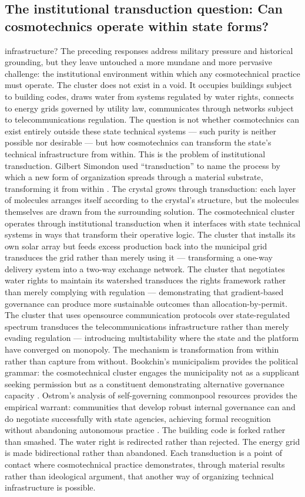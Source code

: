 \subsection{The institutional transduction question: Can cosmotechnics operate within state forms?}

infrastructure? The preceding responses address military pressure and historical grounding, but they leave untouched a more mundane and more pervasive challenge: the institutional environment within which any cosmotechnical practice must operate. The cluster does not exist in a void. It occupies buildings subject to building codes, draws water from systems regulated by water rights, connects to energy grids governed by utility law, communicates through networks subject to telecommunications regulation. The question is not whether cosmotechnics can exist entirely outside these state technical systems — such purity is neither possible nor desirable — but how cosmotechnics can transform the state’s technical infrastructure from within. This is the problem of institutional transduction. Gilbert Simondon used “transduction” to name the process by which a new form of organization spreads through a material substrate, transforming it from within \cite[pp.~11--32]{simondon_2017}. The crystal grows through transduction: each layer of molecules arranges itself according to the crystal’s structure, but the molecules themselves are drawn from the surrounding solution. The cosmotechnical cluster operates through institutional transduction when it interfaces with state technical systems in ways that transform their operative logic. The cluster that installs its own solar array but feeds excess production back into the municipal grid transduces the grid rather than merely using it — transforming a one-way delivery system into a two-way exchange network. The cluster that negotiates water rights to maintain its watershed transduces the rights framework rather than merely complying with regulation — demonstrating that gradient-based governance can produce more sustainable outcomes than allocation-by-permit. The cluster that uses opensource communication protocols over state-regulated spectrum transduces the telecommunications infrastructure rather than merely evading regulation — introducing multistability where the state and the platform have converged on monopoly. The mechanism is transformation from within rather than capture from without. Bookchin’s municipalism provides the political grammar: the cosmotechnical cluster engages the municipality not as a supplicant seeking permission but as a constituent demonstrating alternative governance capacity \cite{bookchin_1998}. Ostrom’s analysis of self-governing commonpool resources provides the empirical warrant: communities that develop robust internal governance can and do negotiate successfully with state agencies, achieving formal recognition without abandoning autonomous practice \cite{ostrom_1990}. The building code is forked rather than smashed. The water right is redirected rather than rejected. The energy grid is made bidirectional rather than abandoned. Each transduction is a point of contact where cosmotechnical practice demonstrates, through material results rather than ideological argument, that another way of organizing technical infrastructure is possible.

